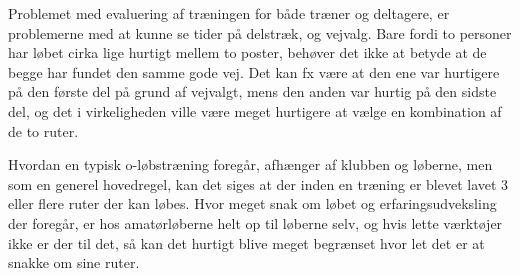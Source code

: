 Problemet med evaluering af træningen for både træner og deltagere, er problemerne med at kunne se tider på delstræk, og vejvalg. Bare fordi to personer har løbet cirka lige hurtigt mellem to poster, behøver det ikke at betyde at de begge har fundet den samme gode vej. Det kan fx være at den ene var hurtigere på den første del på grund af vejvalgt, mens den anden var hurtig på den sidste del, og det i virkeligheden ville være meget hurtigere at vælge en kombination af de to ruter.\newline

Hvordan en typisk o-løbstræning foregår, afhænger af klubben og løberne, men som en generel hovedregel, kan det siges at der inden en træning er blevet lavet 3 eller flere ruter der kan løbes. Hvor meget snak om løbet og erfaringsudveksling der foregår, er hos amatørløberne helt op til løberne selv, og hvis lette værktøjer ikke er der til det, så kan det hurtigt blive meget begrænset hvor let det er at snakke om sine ruter.\newline
